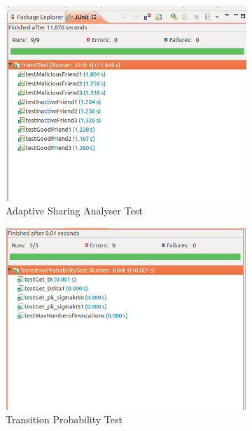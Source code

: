 \documentclass[a4paper,11pt]{article}
\begin{document}
\begin{figure}[H]
\begin{subfigure}{.5\textwidth}
  \centering
  \includegraphics[scale=0.42]{APpendix/ASATest}
  \caption{Adaptive Sharing Analyser Test}
  \label{fig:sub1}
\end{subfigure}%
\begin{subfigure}{.5\textwidth}
  \centering
  \includegraphics[scale=0.42]{APpendix/TPTest}
  \caption{Transition Probability Test}
  \label{fig:sub2}
\end{subfigure}
\vspace{1cm}
\begin{subfigure}{.5\textwidth}
  \centering

\end{subfigure}
\end{figure}
\end{document}

